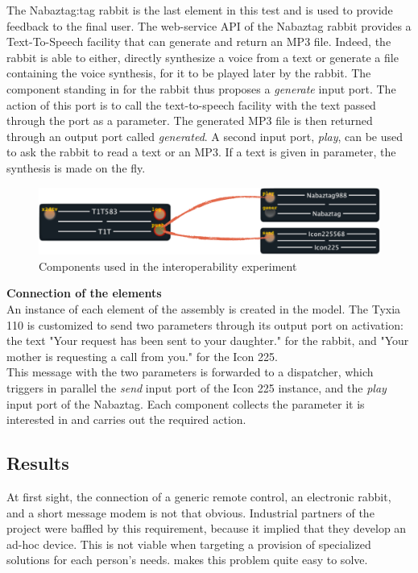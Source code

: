 The Nabaztag:tag rabbit is the last element in this test and is used to provide feedback to the final user. The web-service API of the Nabaztag rabbit provides a Text-To-Speech facility that can generate and return an MP3 file. Indeed, the rabbit is able to either, directly synthesize a voice from a text or generate a file containing the voice synthesis, for it to be played later by the rabbit. The component standing in for the rabbit thus proposes a {\it generate} input port. The action of this port is to call the text-to-speech facility with the text passed through the port as a parameter. The generated MP3 file is then returned through an output port called {\it generated}. A second input port, {\it play}, can be used to ask the rabbit to read a text or an MP3. If a text is given in parameter, the synthesis is made on the fly.\\

\begin{figure}[h!]
\centering
\includegraphics[width=.7\textwidth]{part4/pics/validInterop}
\caption{Components used in the interoperability experiment}
\end{figure}

{\bf Connection of the elements}\\

An instance of each element of the assembly is created in the model. The Tyxia 110 is customized to send two parameters through its output port on activation: the text "Your request has been sent to your daughter." for the rabbit, and "Your mother is requesting a call from you." for the Icon 225.\\
This message with the two parameters is forwarded to a dispatcher, which triggers in parallel the {\it send} input port of the Icon 225 instance, and the {\it play} input port of the Nabaztag. Each component collects the parameter it is interested in and carries out the required action.\\

\subsection{Results}

At first sight, the connection of a generic remote control, an electronic rabbit, and a short message modem is not that obvious. Industrial partners of the project were baffled by this requirement, because it implied that they develop an ad-hoc device. This is not viable when targeting a provision of specialized solutions for each person's needs. \enti{} makes this problem quite easy to solve.\\

